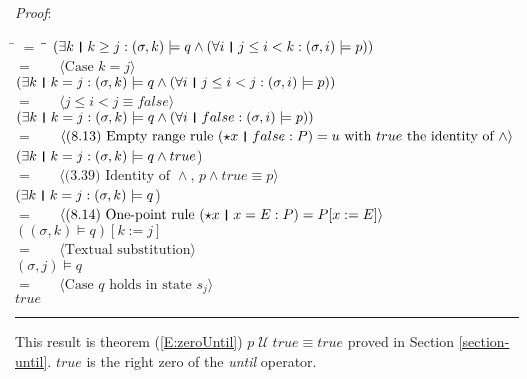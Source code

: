 \documentclass[12pt, fleqn, leqno]{article}
\newcommand{\lgap}{2pt}                             %
\newcommand{\mymathindent}{24pt}                    %
\newcommand{\Until}{\;\mathcal{U}\;}
\newcommand{\myqed}{\rule[-.23ex]{1.2ex}{2.0ex}}
\newcommand{\myqedtab}{\hspace{384pt}}              %
\newcommand{\thedr}{\rule[-.25ex]{.32mm}{1.75ex}}   %
\newcommand{\dr}{\;\,\thedr\,\;}                    %
\newcommand{\rb}{:}                                 %
\newcommand{\all}{\forall}                          %
\newcommand{\ext}{\exists}                          %
\newcommand{\Gll} {\langle}                         %
\newcommand{\Ggg} {\rangle}                         %
\newcommand{\Hint}[1]     {\ \ \ $\Gll              \mbox{#1} \Ggg$ }   %
\begin{document}
\emph{Proof}:
\begin{tabbing}
\hspace{\mymathindent} \= $= \;$ \= \myqedtab \= \kill
	\> \>   $(\ext k \dr k \ge j \rb (\sigma,k) \models q \land (\all i \dr j\le i < k \rb (\sigma,i) \models p))$\\[\lgap]
	\> $=$  \>  \Hint{Case $k=j$}\\[\lgap]
	\> \>   $(\ext k \dr k=j \rb (\sigma,k) \models q \land (\all i \dr j\le i < j \rb (\sigma,i) \models p))$\\[\lgap]
	\> $=$  \>  \Hint{$j\le i < j \equiv false$}\\[\lgap]
	\> \>   $(\ext k \dr k=j \rb (\sigma,k) \models q \land (\all i \dr false \rb (\sigma,i) \models p))$\\[\lgap]
	\> $=$  \>  \Hint{(8.13) Empty range rule $(\star x \dr false \rb P) =u$ with $true$ the identity of $\land$}\\[\lgap]
	\> \>   $(\ext k \dr k=j \rb (\sigma,k) \models q \land true$)\\[\lgap]
	\> $=$  \>  \Hint{(3.39) Identity of $\land$, $p \land true \equiv p$}\\[\lgap]
	\> \>   $(\ext k \dr k=j \rb (\sigma,k) \models q$)\\[\lgap]
	\> $=$  \>  \Hint{(8.14) One-point rule $(\star x\dr x=E\rb P) = P[x:=E]$}\\[\lgap]
	\> \>   $((\sigma,k) \models q)[k := j]$\\[\lgap]
	\> $=$  \>  \Hint{Textual substitution}\\[\lgap]
	\> \>   $(\sigma,j) \models q$\\[\lgap]
	\> $=$  \>  \Hint{Case $q$ holds in state $s_j$}\\[\lgap]
	\> \>   $true$ \quad \myqed
\end{tabbing}
This result is theorem (\ref{E:zeroUntil}) $p \Until true \equiv true$ proved in Section \ref{section-until}.
$true$ is the right zero of the \textit{until} operator.
\end{document}
